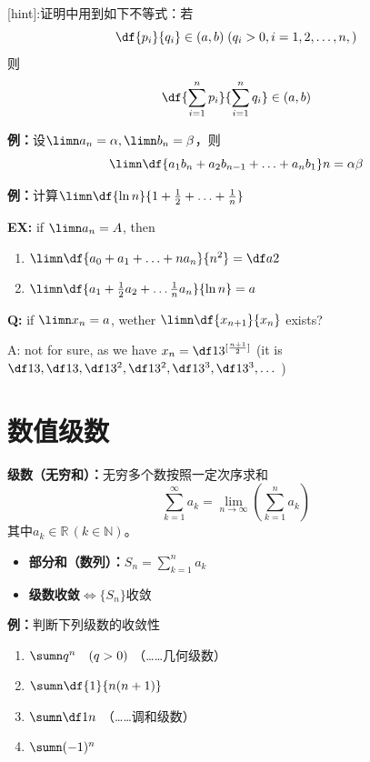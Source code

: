 [hint]:证明中用到如下不等式：若
$$\df{p_i}{q_i}\in(a,b)\;(q_i>0,i=1,2,\ldots,n,)$$
则
$$\df{\sum\limits_{i=1}^np_i}{\sum\limits_{i=1}^nq_i}\in(a,b)$$

{\bf 例：}设$\limn a_n=\alpha,\limn b_n=\beta$，则
$$\limn\df{a_1b_n+a_2b_{n-1}+\ldots+a_nb_1}n=\alpha\beta$$

{\bf 例：}计算$\limn\df{\ln n}{1+\frac12+\ldots+\frac1n}$

{\bf EX:} if $\limn a_n=A$, then
\begin{enumerate}[(1)]
  \setlength{\itemindent}{1cm}
  \item $\limn\df{a_0+a_1+\ldots+na_n}{n^2}=\df a2$
  \item $\limn\df{a_1+\frac12a_2+\ldots\frac1na_n}{\ln n}=a$
\end{enumerate}

{\bf Q:} if $\limn x_n=a$, wether $\limn\df{x_{n+1}}{x_n}$ exists?

A: not for sure, as we have $x_n=\df1{3^{[\frac{n+1}2]}}$ (it is
$\df13, \df13, \df 1{3^2}, \df1{3^2}, \df1{3^3}, \df1{3^3},\ldots$ )


\section{数值级数}

{\bf 级数（无穷和）：}无穷多个数按照一定次序求和
$$\sum\limits_{k=1}^{\infty}a_k
=\lim_{n\to\infty}\left(\sum_{k=1}^na_k\right)$$  
其中$a_k\in\mathbb{R}\,(k\in\mathbb{N})$。

\begin{itemize}
  \item {\bf 部分和（数列）：}$S_n=\sum\limits_{k=1}^na_k$
  \item {\bf 级数收敛}$\Leftrightarrow\{S_n\}$收敛
\end{itemize}

{\bf 例：}判断下列级数的收敛性
\begin{enumerate}[(1)]
  \setlength{\itemindent}{1cm}
  \item $\sumn q^n\quad (q>0)$ （\ldots\ldots 几何级数） 
  \item $\sumn\df{1}{n(n+1)}$ 
  \item $\sumn\df 1n$ （\ldots\ldots 调和级数） 
  \item $\sumn (-1)^n$
\end{enumerate}

